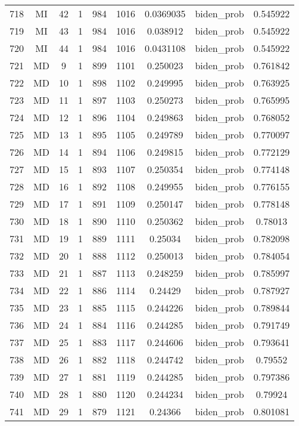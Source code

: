 \documentclass[12pt,a4paper]{article}
\begin{document}
\begin{tabular}{r|cccccccc}
	718 & MI & 42 & 1 & 984 & 1016 & 0.0369035 & biden\_prob & 0.545922 \\
	719 & MI & 43 & 1 & 984 & 1016 & 0.038912 & biden\_prob & 0.545922 \\
	720 & MI & 44 & 1 & 984 & 1016 & 0.0431108 & biden\_prob & 0.545922 \\
	721 & MD & 9 & 1 & 899 & 1101 & 0.250023 & biden\_prob & 0.761842 \\
	722 & MD & 10 & 1 & 898 & 1102 & 0.249995 & biden\_prob & 0.763925 \\
	723 & MD & 11 & 1 & 897 & 1103 & 0.250273 & biden\_prob & 0.765995 \\
	724 & MD & 12 & 1 & 896 & 1104 & 0.249863 & biden\_prob & 0.768052 \\
	725 & MD & 13 & 1 & 895 & 1105 & 0.249789 & biden\_prob & 0.770097 \\
	726 & MD & 14 & 1 & 894 & 1106 & 0.249815 & biden\_prob & 0.772129 \\
	727 & MD & 15 & 1 & 893 & 1107 & 0.250354 & biden\_prob & 0.774148 \\
	728 & MD & 16 & 1 & 892 & 1108 & 0.249955 & biden\_prob & 0.776155 \\
	729 & MD & 17 & 1 & 891 & 1109 & 0.250147 & biden\_prob & 0.778148 \\
	730 & MD & 18 & 1 & 890 & 1110 & 0.250362 & biden\_prob & 0.78013 \\
	731 & MD & 19 & 1 & 889 & 1111 & 0.25034 & biden\_prob & 0.782098 \\
	732 & MD & 20 & 1 & 888 & 1112 & 0.250013 & biden\_prob & 0.784054 \\
	733 & MD & 21 & 1 & 887 & 1113 & 0.248259 & biden\_prob & 0.785997 \\
	734 & MD & 22 & 1 & 886 & 1114 & 0.24429 & biden\_prob & 0.787927 \\
	735 & MD & 23 & 1 & 885 & 1115 & 0.244226 & biden\_prob & 0.789844 \\
	736 & MD & 24 & 1 & 884 & 1116 & 0.244285 & biden\_prob & 0.791749 \\
	737 & MD & 25 & 1 & 883 & 1117 & 0.244606 & biden\_prob & 0.793641 \\
	738 & MD & 26 & 1 & 882 & 1118 & 0.244742 & biden\_prob & 0.79552 \\
	739 & MD & 27 & 1 & 881 & 1119 & 0.244285 & biden\_prob & 0.797386 \\
	740 & MD & 28 & 1 & 880 & 1120 & 0.244234 & biden\_prob & 0.79924 \\
	741 & MD & 29 & 1 & 879 & 1121 & 0.24366 & biden\_prob & 0.801081 \\

\end{tabular}
\end{document}
